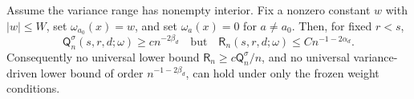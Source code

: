 Assume the variance range has nonempty interior.  Fix a nonzero constant \(w\) with \(|w|\leq W\), set \(\omega_{a_0}(x)=w\), and set \(\omega_a(x)=0\) for \(a\neq a_0\).  Then, for fixed \(r<s\),
\[
\mathsf Q_n^{\sigma}(s,r,d;\omega)\geq c n^{-2\beta_d}
\quad\text{but}\quad
\mathsf R_n(s,r,d;\omega)\leq C n^{-1-2\alpha_d}.
\]
Consequently no universal lower bound \(\mathsf R_n\geq c\mathsf Q_n^{\sigma}/n\), and no universal variance-driven lower bound of order \(n^{-1-2\beta_d}\), can hold under only the frozen weight conditions.